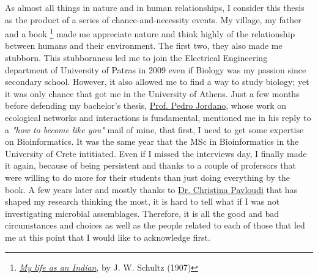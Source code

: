 \documentclass[master=elt, cleveref, autoref, masteroption=eg]{kulemt}
\begin{document}
\begin{preface}
   As almost all things in nature and in human relationships, I consider 
   this thesis as the product of a series of chance-and-necessity events. 
   My village, my father and a book
   \footnote{\href{https://www.simonandschuster.com/books/My-Life-as-an-Indian/J-W-Schultz/9781634504270}{\textit{My life as an Indian}}, by J. W. Schultz (1907)} 
   made me appreciate nature and think highly of the relationship between humans and their environment. 
   The first two, they also made me stubborn. 
   This stubbornness led me to join the Electrical Engineering department of University of Patras in 2009
   even if Biology was my passion since secondary school.
   However, it also allowed me to find a way to study biology; 
   yet it was only chance that got me in the University of Athens. 
   Just a few months before defending my bachelor's thesis,
   \href{http://ebd10.ebd.csic.es/}{Prof. Pedro Jordano},
   whose work on ecological networks and interactions is fundamental,
   mentioned me in his reply to a \textit{"how to become like you"} mail of mine, 
   that first, I need to get some expertise on Bioinformatics.
   It was the same year that the MSc in Bioinformatics in the University of Crete intitiated. 
   Even if I missed the interviews day, I finally made it again, because of being persistent and 
   thanks to a couple of profersors that were willing to do more for their students 
   than just doing everything by the book. 
   A few years later and mostly thanks to \href{https://cpavloud.github.io/mysite/}{Dr. Christina Pavloudi}  
   that has shaped 
   my research thinking the most,
   it is hard to tell what if I was not investigating microbial assemblages.
   Therefore, it is all the good and bad circumstances and choices as well as the people 
   related to each of those 
   that led me at this point that I would like to acknowledge first. 


\end{preface}
\end{document}
